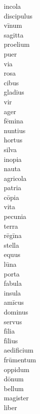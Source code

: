 \documentclass[nols]{tufte-handout}
\begin{document}
\begin{multicols}{5}
incola \\
discipulus \\
vīnum \\
sagitta \\
proelium \\
puer \\ 
via \\ 
rosa \\
cibus \\ 

gladius \\ 
vir \\
ager \\
fēmina \\
nuntius \\
hortus \\
silva \\
inopia \\
nauta \\ 

agricola \\ 
patria \\
cōpia \\ 
vita \\
pecunia \\
terra  \\
rēgīna  \\
stella  \\
equus  \\

lūna  \\
porta  \\
fabula \\
insula \\
amīcus  \\
dominus  \\
servus  \\
fīlia  \\
fīlius  \\

aedificium \\ 
frūmentum  \\
oppidum \\
dōnum  \\
bellum  \\
magister  \\
liber 

\end{multicols}
\end{document}
